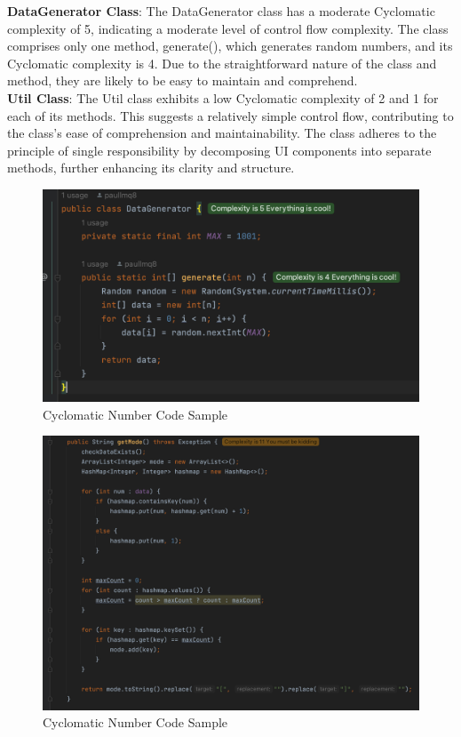 \documentclass[12pt,letterpaper]{report}
\begin{document}
\textbf{DataGenerator Class}: 
 The DataGenerator class has a moderate Cyclomatic complexity of 5, indicating a moderate level of control flow complexity. The class comprises only one method, generate(), which generates random numbers, and its Cyclomatic complexity is 4. Due to the straightforward nature of the class and method, they are likely to be easy to maintain and comprehend.\\

\textbf{Util Class}: The Util class exhibits a low Cyclomatic complexity of 2 and 1 for each of its methods. This suggests a relatively simple control flow, contributing to the class's ease of comprehension and maintainability. The class adheres to the principle of single responsibility by decomposing UI components into separate methods, further enhancing its clarity and structure. \\

\begin{figure}
    \begin{center}
    \includegraphics[width=0.5\linewidth]{cc1.png}
    \end{center}
       \caption{Cyclomatic Number Code Sample \label{Code Sample}}
\end{figure}

\begin{figure}
    \begin{center}
    \includegraphics[width=0.5\linewidth]{cc2.png}
    \end{center}
       \caption{Cyclomatic Number Code Sample \label{Code Sample}}
\end{figure}
\end{document}
